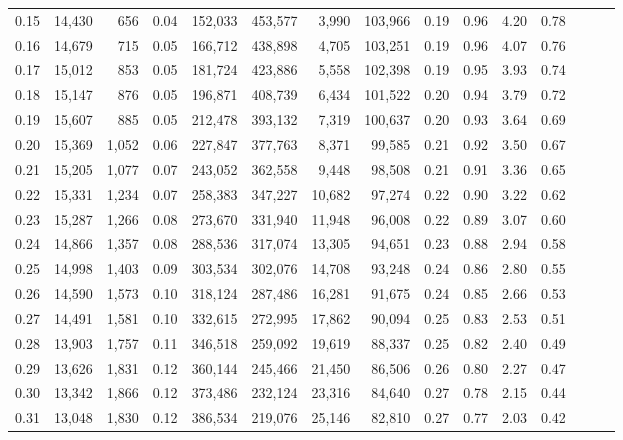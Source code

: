 \begin{tabular}{rrrrrrrrrrrrrrr}
0.15 &  14,430 &    656 &  0.04 &  152,033 &  453,577 &    3,990 &  103,966 &  0.19 &  0.96 &  4.20 &      0.78 \\
0.16 &  14,679 &    715 &  0.05 &  166,712 &  438,898 &    4,705 &  103,251 &  0.19 &  0.96 &  4.07 &      0.76 \\
0.17 &  15,012 &    853 &  0.05 &  181,724 &  423,886 &    5,558 &  102,398 &  0.19 &  0.95 &  3.93 &      0.74 \\
0.18 &  15,147 &    876 &  0.05 &  196,871 &  408,739 &    6,434 &  101,522 &  0.20 &  0.94 &  3.79 &      0.72 \\
0.19 &  15,607 &    885 &  0.05 &  212,478 &  393,132 &    7,319 &  100,637 &  0.20 &  0.93 &  3.64 &      0.69 \\
0.20 &  15,369 &  1,052 &  0.06 &  227,847 &  377,763 &    8,371 &   99,585 &  0.21 &  0.92 &  3.50 &      0.67 \\
0.21 &  15,205 &  1,077 &  0.07 &  243,052 &  362,558 &    9,448 &   98,508 &  0.21 &  0.91 &  3.36 &      0.65 \\
0.22 &  15,331 &  1,234 &  0.07 &  258,383 &  347,227 &   10,682 &   97,274 &  0.22 &  0.90 &  3.22 &      0.62 \\
0.23 &  15,287 &  1,266 &  0.08 &  273,670 &  331,940 &   11,948 &   96,008 &  0.22 &  0.89 &  3.07 &      0.60 \\
0.24 &  14,866 &  1,357 &  0.08 &  288,536 &  317,074 &   13,305 &   94,651 &  0.23 &  0.88 &  2.94 &      0.58 \\
0.25 &  14,998 &  1,403 &  0.09 &  303,534 &  302,076 &   14,708 &   93,248 &  0.24 &  0.86 &  2.80 &      0.55 \\
0.26 &  14,590 &  1,573 &  0.10 &  318,124 &  287,486 &   16,281 &   91,675 &  0.24 &  0.85 &  2.66 &      0.53 \\
0.27 &  14,491 &  1,581 &  0.10 &  332,615 &  272,995 &   17,862 &   90,094 &  0.25 &  0.83 &  2.53 &      0.51 \\
0.28 &  13,903 &  1,757 &  0.11 &  346,518 &  259,092 &   19,619 &   88,337 &  0.25 &  0.82 &  2.40 &      0.49 \\
0.29 &  13,626 &  1,831 &  0.12 &  360,144 &  245,466 &   21,450 &   86,506 &  0.26 &  0.80 &  2.27 &      0.47 \\
0.30 &  13,342 &  1,866 &  0.12 &  373,486 &  232,124 &   23,316 &   84,640 &  0.27 &  0.78 &  2.15 &      0.44 \\
0.31 &  13,048 &  1,830 &  0.12 &  386,534 &  219,076 &   25,146 &   82,810 &  0.27 &  0.77 &  2.03 &      0.42 \\

\end{tabular}
